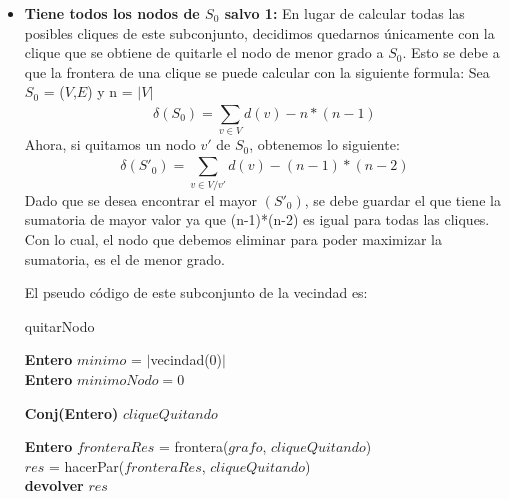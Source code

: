 \begin{itemize}
\item \textbf{Tiene todos los nodos de $S_{0}$ salvo 1:} \newline En lugar de calcular todas las posibles cliques de este subconjunto, decidimos quedarnos únicamente con la clique que se obtiene de quitarle el nodo de menor grado a $S_{0}$. Esto se debe a que la frontera de una clique se puede calcular con la siguiente formula:\newline
Sea $S_{0}$ = ($V$,$E$) y n = $|$$V$$|$
\begin{equation}
  \delta(S_{0}) = \sum_{v \in V}^{} d(v) - n*(n-1)
\end{equation}
Ahora, si quitamos un nodo $v'$ de $S_{0}$, obtenemos lo siguiente:
\begin{equation}
  \delta(S'_{0}) = \sum_{v \in V/v'}^{} d(v) - (n-1)*(n-2)
\end{equation}
Dado que se desea encontrar el mayor \delta$(S'_{0})$, se debe guardar el que tiene la sumatoria de mayor valor ya que (n-1)*(n-2) es igual para todas las cliques. Con lo cual, el nodo que debemos eliminar para poder maximizar la sumatoria, es el de menor grado.

El pseudo código de este subconjunto de la vecindad es:\newline
\begin{algorithm}[H]
    \SetAlgoLined
    \caption{quitarNodo}
	
    \textbf{Entero} $minimo$ = $|$vecindad(0)$|$ \\	
    \textbf{Entero} $minimoNodo = 0$ \\
    
    \textbf{Conj(Entero)} $cliqueQuitando$\\

    
    \textbf{Entero} $fronteraRes$ = frontera($grafo$, $cliqueQuitando$)\\
    $res$ = hacerPar($fronteraRes$, $cliqueQuitando$)\\
    \textbf{devolver} $res$ \\
\end{algorithm}


\end{itemize}
